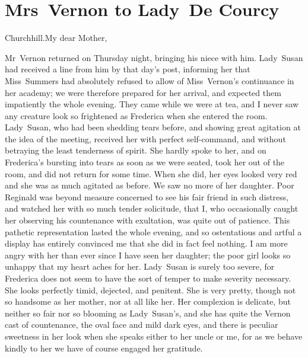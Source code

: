 \chapter{Mrs~Vernon to Lady~De Courcy}
  
  \begin{mail}{Churchhill.}{My dear Mother,}

Mr~Vernon returned on Thursday night, bringing his niece with him. Lady~Susan had received a line from him by that day's post, informing her that Miss~Summers had absolutely refused to allow of Miss~Vernon's continuance in her academy; we were therefore prepared for her arrival, and expected them impatiently the whole evening. They came while we were at tea, and I never saw any creature look so frightened as Frederica when she entered the room. Lady~Susan, who had been shedding tears before, and showing great agitation at the idea of the meeting, received her with perfect self-command, and without betraying the least tenderness of spirit. She hardly spoke to her, and on Frederica's bursting into tears as soon as we were seated, took her out of the room, and did not return for some time. When she did, her eyes looked very red and she was as much agitated as before. We saw no more of her daughter. Poor Reginald was beyond measure concerned to see his fair friend in such distress, and watched her with so much tender solicitude, that I, who occasionally caught her observing his countenance with exultation, was quite out of patience. This pathetic representation lasted the whole evening, and so ostentatious and artful a display has entirely convinced me that she did in fact feel nothing. I am more angry with her than ever since I have seen her daughter; the poor girl looks so unhappy that my heart aches for her. Lady~Susan is surely too severe, for Frederica does not seem to have the sort of temper to make severity necessary. She looks perfectly timid, dejected, and penitent. She is very pretty, though not so handsome as her mother, nor at all like her. Her complexion is delicate, but neither so fair nor so blooming as Lady~Susan's, and she has quite the Vernon cast of countenance, the oval face and mild dark eyes, and there is peculiar sweetness in her look when she speaks either to her uncle or me, for as we behave kindly to her we have of course engaged her gratitude.


\end{mail}
